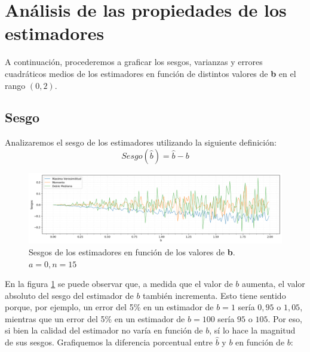 \section{Análisis de las propiedades de los estimadores}
A continuación, procederemos a graficar los sesgos, varianzas y errores cuadráticos medios de los estimadores en función de distintos valores de \textbf{b} en el rango $(0, 2)$.

\subsection{Sesgo}
Analizaremos el sesgo de los estimadores utilizando la siguiente definición:
$$Sesgo(\hat{b}) = \hat{b} - b$$

\begin{figure}[H]
	\centering
	\includegraphics[width=1\textwidth]{imagenes/sesgos.png}
	\caption{\footnotesize Sesgos de los estimadores en función de los valores de \textbf{b}. $a=0, n=15$}
	\label{fig:ej6-sesgos}
\end{figure}

En la figura \ref{fig:ej6-sesgos} se puede observar que, a medida que el valor de $b$ aumenta, el valor absoluto del sesgo del estimador de $b$ también incrementa. Esto tiene sentido porque, por ejemplo, un error del 5\% en un estimador de $b=1$ sería $0,95$ o $1,05$, mientras que un error del 5\% en un estimador de $b = 100$ sería $95$ o $105$. Por eso, si bien la calidad del estimador no varía en función de $b$, sí lo hace la magnitud de sus sesgos. Grafiquemos la diferencia porcentual entre $\hat{b}$ y $b$ en función de $b$:


